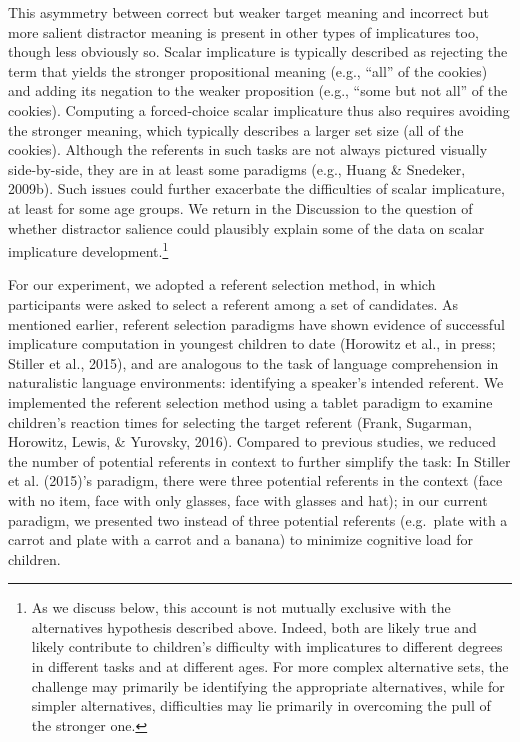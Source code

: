 \documentclass[mask,man]{apa6}
\theoremstyle{definition}
\theoremstyle{definition}
\theoremstyle{definition}
\theoremstyle{remark}
\begin{document}
This asymmetry between correct but weaker target meaning and incorrect
but more salient distractor meaning is present in other types of
implicatures too, though less obviously so. Scalar implicature is
typically described as rejecting the term that yields the stronger
propositional meaning (e.g., \enquote{all} of the cookies) and adding
its negation to the weaker proposition (e.g., \enquote{some but not all}
of the cookies). Computing a forced-choice scalar implicature thus also
requires avoiding the stronger meaning, which typically describes a
larger set size (all of the cookies). Although the referents in such
tasks are not always pictured visually side-by-side, they are in at
least some paradigms (e.g., Huang \& Snedeker, 2009b). Such issues could
further exacerbate the difficulties of scalar implicature, at least for
some age groups. We return in the Discussion to the question of whether
distractor salience could plausibly explain some of the data on scalar
implicature development.\footnote{As we discuss below, this account is
  not mutually exclusive with the alternatives hypothesis described
  above. Indeed, both are likely true and likely contribute to
  children's difficulty with implicatures to different degrees in
  different tasks and at different ages. For more complex alternative
  sets, the challenge may primarily be identifying the appropriate
  alternatives, while for simpler alternatives, difficulties may lie
  primarily in overcoming the pull of the stronger one.}

For our experiment, we adopted a referent selection method, in which
participants were asked to select a referent among a set of candidates.
As mentioned earlier, referent selection paradigms have shown evidence
of successful implicature computation in youngest children to date
(Horowitz et al., in press; Stiller et al., 2015), and are analogous to
the task of language comprehension in naturalistic language
environments: identifying a speaker's intended referent. We implemented
the referent selection method using a tablet paradigm to examine
children's reaction times for selecting the target referent (Frank,
Sugarman, Horowitz, Lewis, \& Yurovsky, 2016). Compared to previous
studies, we reduced the number of potential referents in context to
further simplify the task: In Stiller et al. (2015)'s paradigm, there
were three potential referents in the context (face with no item, face
with only glasses, face with glasses and hat); in our current paradigm,
we presented two instead of three potential referents (e.g.~plate with a
carrot and plate with a carrot and a banana) to minimize cognitive load
for children.
\end{document}
